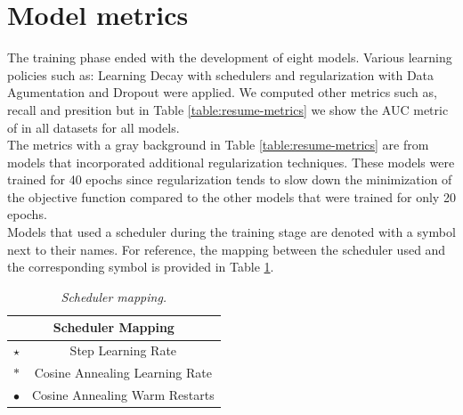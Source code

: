 \section{Model metrics}

The training phase ended with the development of eight models. Various learning
policies such as: Learning Decay with schedulers and regularization with Data
Agumentation and Dropout were applied. We computed other metrics such as,
recall and presition but in Table \ref{table:resume-metrics} we show the AUC
metric of in all datasets for all models. \\

The metrics with a gray background in Table \ref{table:resume-metrics}
are from models that incorporated additional regularization techniques. These
models were trained for 40 epochs since regularization tends to slow down the
minimization of the objective function compared to the other models that were
trained for only 20 epochs. \\

Models that used a scheduler during the training stage are denoted with a
symbol next to their names. For reference, the mapping between the scheduler
used and the corresponding symbol is provided in Table
\ref{table:scheduler-mapping}.

\begin{table}[H]
  \centering
  \begin{tabular}{cc}
    \toprule
    \multicolumn{2}{c}{\textbf{Scheduler Mapping}} \\
    \midrule
    $\star$     & Step Learning Rate \\
    $\ast$      & Cosine Annealing Learning Rate \\
    $\bullet$   & Cosine Annealing Warm Restarts \\
    \bottomrule
  \end{tabular}
  \caption[Scheduler mapping]
  {\textit{Scheduler mapping.}}
  \label{table:scheduler-mapping}
\end{table}


